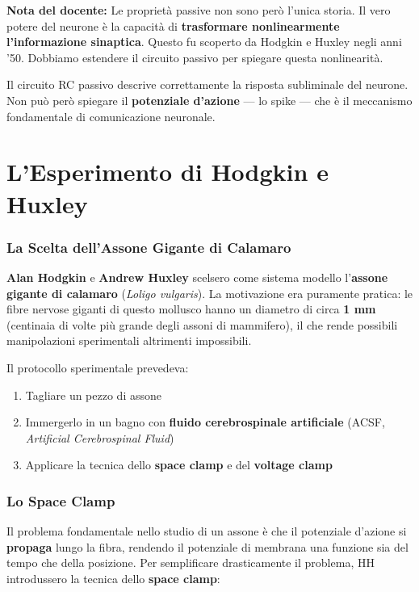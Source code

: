 \begin{tcolorbox}[colback=gray!5, colframe=gray!40, arc=2mm, boxrule=0.5pt]
\textbf{Nota del docente:} Le proprietà passive non sono però l'unica storia. Il vero potere del neurone è la capacità di \textbf{trasformare nonlinearmente l'informazione sinaptica}. Questo fu scoperto da Hodgkin e Huxley negli anni '50. Dobbiamo estendere il circuito passivo per spiegare questa nonlinearità.
\end{tcolorbox}

Il circuito RC passivo descrive correttamente la risposta subliminale del neurone. Non può però spiegare il \textbf{potenziale d'azione} — lo spike — che è il meccanismo fondamentale di comunicazione neuronale.

\newpage

\section{L'Esperimento di Hodgkin e Huxley}

\subsubsection{La Scelta dell'Assone Gigante di Calamaro}

\textbf{Alan Hodgkin} e \textbf{Andrew Huxley} scelsero come sistema modello l'\textbf{assone gigante di calamaro} (\textit{Loligo vulgaris}). La motivazione era puramente pratica: le fibre nervose giganti di questo mollusco hanno un diametro di circa \textbf{1 mm} (centinaia di volte più grande degli assoni di mammifero), il che rende possibili manipolazioni sperimentali altrimenti impossibili.

Il protocollo sperimentale prevedeva:
\begin{enumerate}
    \item Tagliare un pezzo di assone
    \item Immergerlo in un bagno con \textbf{fluido cerebrospinale artificiale} (ACSF, \textit{Artificial Cerebrospinal Fluid})
    \item Applicare la tecnica dello \textbf{space clamp} e del \textbf{voltage clamp}
\end{enumerate}

\subsubsection{Lo Space Clamp}

Il problema fondamentale nello studio di un assone è che il potenziale d'azione si \textbf{propaga} lungo la fibra, rendendo il potenziale di membrana una funzione sia del tempo che della posizione. Per semplificare drasticamente il problema, HH introdussero la tecnica dello \textbf{space clamp}:

